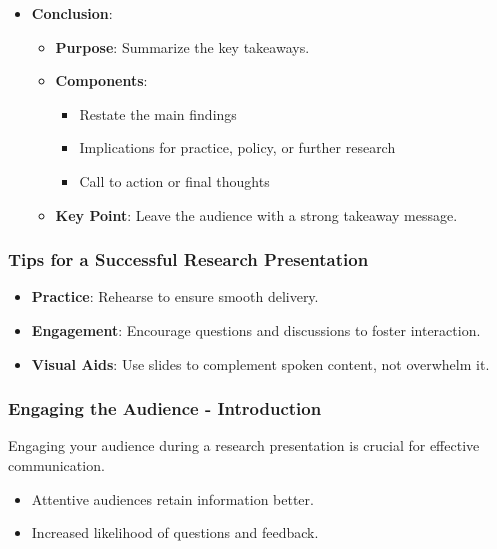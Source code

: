\documentclass[aspectratio=169]{beamer}
\begin{document}
\begin{frame}[fragile]
\begin{itemize}
        \item \textbf{Conclusion}:
        \begin{itemize}
            \item \textbf{Purpose}: Summarize the key takeaways.
            \item \textbf{Components}:
            \begin{itemize}
                \item Restate the main findings
                \item Implications for practice, policy, or further research
                \item Call to action or final thoughts
            \end{itemize}
            \item \textbf{Key Point}: Leave the audience with a strong takeaway message.
        \end{itemize}
    \end{itemize}
\end{frame}

\begin{frame}[fragile]
    \frametitle{Tips for a Successful Research Presentation}
    \begin{itemize}
        \item \textbf{Practice}: Rehearse to ensure smooth delivery.
        \item \textbf{Engagement}: Encourage questions and discussions to foster interaction.
        \item \textbf{Visual Aids}: Use slides to complement spoken content, not overwhelm it.
    \end{itemize}
\end{frame}

\begin{frame}[fragile]
    \frametitle{Engaging the Audience - Introduction}
    Engaging your audience during a research presentation is crucial for effective communication. 
    \begin{itemize}
        \item Attentive audiences retain information better.
        \item Increased likelihood of questions and feedback.
    \end{itemize}
\end{frame}
\end{document}
